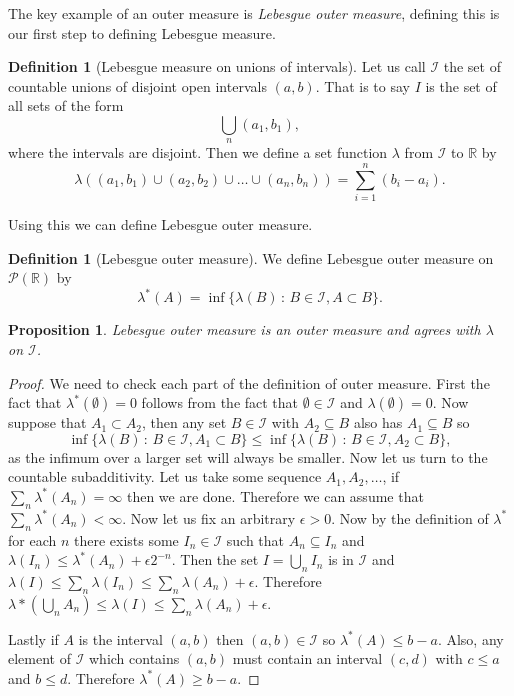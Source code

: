 \documentclass[11pt]{article}
\newtheorem{prp}[thm]{Proposition}
\theoremstyle{definition}
\newtheorem{dfn}[thm]{Definition}
\theoremstyle{remark}
\begin{document}
The key example of an outer measure is \emph{Lebesgue outer measure}, defining this is our first step to defining Lebesgue measure.
\begin{dfn}[Lebesgue measure on unions of intervals]
Let us call $\mathcal{I}$ the set of countable unions of disjoint open intervals $(a,b)$. That is to say $I$ is the set of all sets of the form
\[ \bigcup_n (a_1,b_1), \] where the intervals are disjoint. Then we define a set function $\lambda$ from $\mathcal{I}$ to $\mathbb{R}$ by
\[ \lambda \left(  (a_1, b_1) \cup (a_2,b_2) \cup \dots \cup (a_n,b_n) \right) = \sum_{i=1}^n (b_i-a_i).\]
\end{dfn}
Using this we can define Lebesgue outer measure.
\begin{dfn}[Lebesgue outer measure]
We define Lebesgue outer measure on $\mathscr{P}(\mathbb{R})$ by 
\[ \lambda^* (A) = \inf \{ \lambda (B) \, : \, B \in \mathcal{I}, A \subset B\}. \]
\end{dfn}

\begin{prp}
Lebesgue outer measure is an outer measure and agrees with $\lambda$ on $\mathcal{I}$.
\end{prp}
\begin{proof}
We need to check each part of the definition of outer measure. First the fact that $\lambda^*(\emptyset) = 0$ follows from the fact that $\emptyset \in \mathcal{I}$ and $\lambda(\emptyset) = 0$. Now suppose that $A_1 \subset A_2$, then any set $B \in \mathcal{I}$ with $A_2 \subseteq B$ also has $A_1 \subseteq B$ so 
\[ \inf \{ \lambda (B) \, : \, B \in \mathcal{I}, A_1 \subset B\} \leq \inf \{ \lambda (B) \, : \, B \in \mathcal{I}, A_2 \subset B\}, \] as the infimum over a larger set will always be smaller. Now let us turn to the countable subadditivity. Let us take some sequence $A_1, A_2, \dots$, if $\sum_n \lambda^*(A_n) = \infty$ then we are done. Therefore we can assume that $\sum_n \lambda^*(A_n) < \infty$. Now let us fix an arbitrary $\epsilon>0$. Now by the definition of $\lambda^*$ for each $n$ there exists some $I_n \in \mathcal{I}$ such that $A_n \subseteq I_n$ and $\lambda(I_n) \leq \lambda^* (A_n) + \epsilon 2^{-n}$. Then the set $I = \bigcup_n I_n$ is in $\mathcal{I}$ and $\lambda(I) \leq \sum_n \lambda(I_n) \leq \sum_n \lambda(A_n) + \epsilon$. Therefore $\lambda*(\bigcup_n A_n) \leq \lambda(I) \leq \sum_n \lambda(A_n) + \epsilon$.

Lastly if $A$ is the interval $(a,b)$ then $(a,b) \in \mathcal{I}$ so $\lambda^*(A) \leq b-a$. Also, any element of $\mathcal{I}$ which contains $(a,b)$ must contain an interval $(c,d)$ with $c \leq a$ and $b \leq d$. Therefore $\lambda^*(A) \geq b-a$.
\end{proof}
\end{document}
